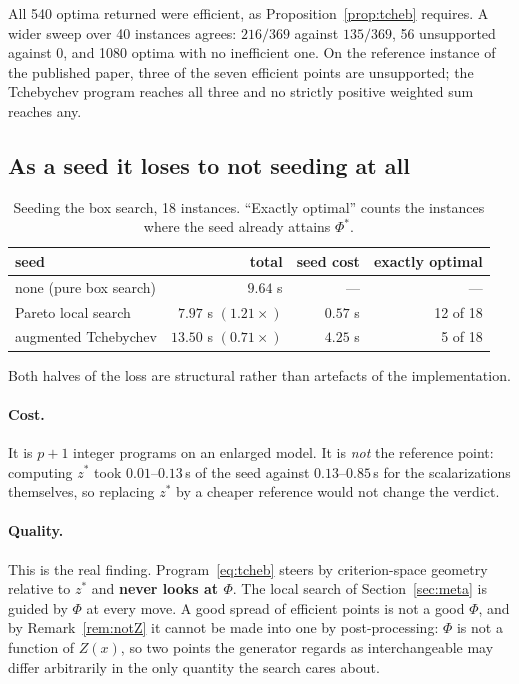 \documentclass[11pt,a4paper]{article}
\newcommand{\Z}{Z}
\begin{document}
\noindent
All 540 optima returned were efficient, as Proposition~\ref{prop:tcheb}
requires. A wider sweep over 40 instances agrees: $216/369$ against $135/369$,
56 unsupported against 0, and 1080 optima with no inefficient one. On the
reference instance of the published paper, three of the seven efficient points
are unsupported; the Tchebychev program reaches all three and no strictly
positive weighted sum reaches any.

\subsection{As a seed it loses to not seeding at all}

\begin{table}[h]
\centering
\caption{Seeding the box search, 18 instances. ``Exactly optimal'' counts the
instances where the seed already attains $\Phi^{*}$.}
\begin{tabular}{lrrr}
\toprule
seed & total & seed cost & exactly optimal \\
\midrule
none (pure box search) & $9.64$ s  & ---      & --- \\
Pareto local search    & $\mathbf{7.97}$ s $(1.21\times)$ & $0.57$ s & 12 of 18 \\
augmented Tchebychev   & $13.50$ s $(0.71\times)$ & $4.25$ s & 5 of 18 \\
\bottomrule
\end{tabular}
\end{table}

\noindent
Both halves of the loss are structural rather than artefacts of the
implementation.

\paragraph{Cost.} It is $p+1$ integer programs on an enlarged model. It is
\emph{not} the reference point: computing $z^{*}$ took $0.01$--$0.13$\,s of the
seed against $0.13$--$0.85$\,s for the scalarizations themselves, so replacing
$z^{*}$ by a cheaper reference would not change the verdict.

\paragraph{Quality.} This is the real finding. Program~\eqref{eq:tcheb} steers
by criterion-space geometry relative to $z^{*}$ and \textbf{never looks at
$\Phi$}. The local search of Section~\ref{sec:meta} is guided by $\Phi$ at
every move. A good spread of efficient points is not a good $\Phi$, and by
Remark~\ref{rem:notZ} it cannot be made into one by post-processing: $\Phi$ is
not a function of $\Z(x)$, so two points the generator regards as
interchangeable may differ arbitrarily in the only quantity the search cares
about.
\end{document}
